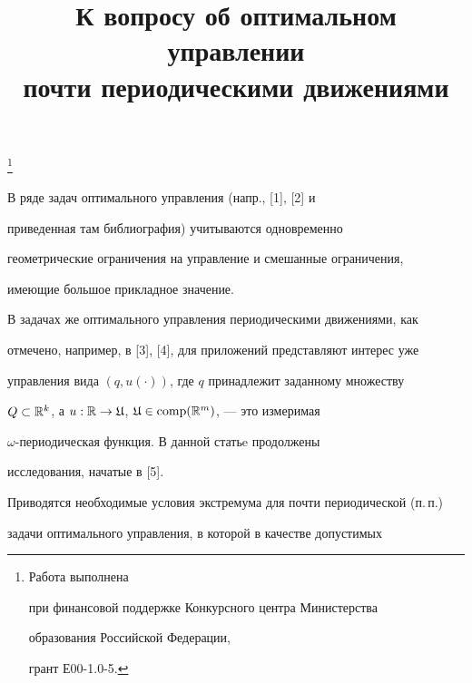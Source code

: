

\title{К вопросу об оптимальном управлении \\


почти периодическими движениями}


\thanks{Работа выполнена


при финансовой поддержке Конкурсного центра Министерства


образования Российской Федерации,


грант Е00-1.0-5.}





\date{}




\pagestyle{plain} %







\maketitle


\label{begin}








В ряде задач оптимального управления (напр., [1], [2] и


приведенная там библиография) учитываются одновременно


геометрические ограничения на управление и смешанные ограничения,


имеющие большое прикладное значение. 


В задачах же оптимального управления периодическими движениями, как


отмечено, например, в [3], [4], для приложений представляют интерес уже


управления вида $(q,u(\cdot))$, где $q$ принадлежит заданному множеству


$Q\subset\Bbb R^{k}$, а $u:\Bbb R\to\frak U$, $\frak U\in\operatorname{comp}(\Bbb R^{m})$, --- это измеримая


$\omega$-периодическая функция. В данной статьe продолжены


исследования, начатые в [5].


Приводятся необходимые условия экстремума для почти периодической (п.\,п.)


задачи оптимального управления, в которой в качестве допустимых


